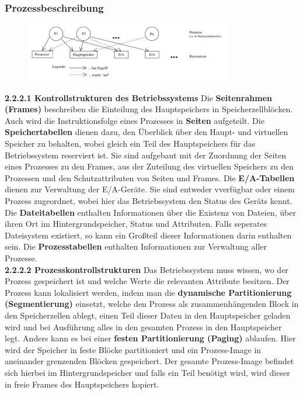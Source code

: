 \documentclass{article}
\begin{document}
\subsubsection{Prozessbeschreibung}
    \begin{figure}[h]
        \centering
	    \includegraphics[width=90mm]{Skizzen/2_Kapitel/Systemressourcen.png}
    \end{figure}
    \textbf{2.2.2.1 Kontrollstrukturen des Betriebssystems}\newline
    Die \textbf{Seitenrahmen (Frames)} beschreiben die Einteilung des Hauptspeichers in Speicherzellblöcken. Auch wird die Instruktionsfolge eines Prozesses in \textbf{Seiten} aufgeteilt.\newline
    Die \textbf{Speichertabellen} dienen dazu, den Überblick über den Haupt- und virtuellen Speicher zu behalten, wobei gleich ein Teil des Hauptspeichers für das Betriebssystem reserviert ist. Sie sind aufgebaut mit der Zuordnung der Seiten eines Prozesses zu den Frames, aus der Zuteilung des virtuellen Speichers zu den Prozessen und den Schutzattributen von Seiten und Frames.\newline
    Die \textbf{E/A-Tabellen} dienen zur Verwaltung der E/A-Geräte. Sie sind entweder vverfügbar oder einem Prozess zugeordnet, wobei hier das Betriebssystem den Status des Geräts kennt.\newline
    Die \textbf{Dateitabellen} enthalten Informationen über die Existenz von Dateien, über ihren Ort im Hintergrundspeicher, Status und Attributen. Falls seperates Dateisystem existiert, so kann ein Großteil dieser Informationen darin enthalten sein.\newline
    Die \textbf{Prozesstabellen} enthalten Informationen zur Verwaltung aller Prozesse.\newline
    \\
    \textbf{2.2.2.2 Prozesskontrollstrukturen}\newline
    Das Betriebssystem muss wissen, wo der Prozess gespeichert ist und welche Werte die relevanten Attribute besitzen.\newline
    Der Prozess kann lokalisiert werden, indem man die \textbf{dynamische Partitionierung (Segmentierung)} einsetzt, welche den Prozess als zusammenhängenden Block in den Speicherzellen ablegt, einen Teil dieser Daten in den Hauptspeicher geladen wird und bei Ausführung alles in den gesamten Prozess in den Hauptspeicher legt. Anders kann es bei einer \textbf{festen Partitionierung (Paging)} ablaufen. Hier wird der Speicher in feste Blöcke partitioniert und ein Prozess-Image in aneinander grenzenden Blöcken gespeichert. Der gesamte Prozess-Image befindet sich hierbei im Hintergrundspeicher und falls ein Teil benötigt wird, wird dieser in freie Frames des Hauptspeichers kopiert.\newline 
\end{document}

